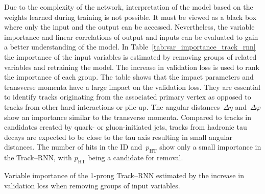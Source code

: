Due to the complexity of the network, interpretation of the model based on the
weights learned during training is not possible. It must be viewed as a black
box where only the input and the output can be accessed. Nevertheless, the
variable importance and linear correlations of output and inputs can be
evaluated to gain a better understanding of the model. In
Table~\ref{tab:var_importance_track_rnn} the importance of the input variables
is estimated by removing groups of related variables and retraining the model.
The increase in validation loss is used to rank the importance of each group.
The table shows that the impact parameters and transverse momenta have a large
impact on the validation loss. They are essential to identify tracks originating
from the associated primary vertex as opposed to tracks from other hard
interactions or pile-up. The angular distances~$\Delta \eta$
and~$\Delta \varphi$ show an importance similar to the transverse momenta.
Compared to tracks in \tauhadvis candidates created by quark- or gluon-initiated
jets, tracks from hadronic tau decays are expected to be close to the tau axis
resulting in small angular distances. The number of hits in the ID
and~$p_\text{HT}$ show only a small importance in the Track--RNN, with
$p_\text{HT}$ being a candidate for removal.

\begin{table}[htb]
  \centering
  {\small}
  \caption{Variable importance of the 1-prong Track--RNN estimated by the
    increase in validation loss when removing groups of input variables.}
  \label{tab:var_importance_track_rnn}
\end{table}

